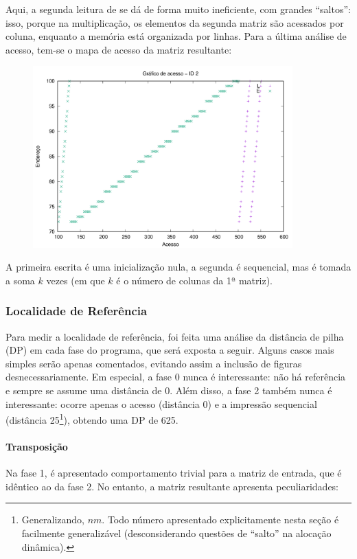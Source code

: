\documentclass{article}
\begin{document}
Aqui, a segunda leitura de se dá de forma muito ineficiente, com grandes ``saltos'': isso, porque na multiplicação, os elementos da segunda matriz são acessados por coluna, enquanto a memória está organizada por linhas. Para a última análise de acesso, tem-se o mapa de acesso da matriz resultante:

\begin{figure} [H]
    \includegraphics[width=10cm]{m-acesso-2.png} 
    \centering
\end{figure}

A primeira escrita é uma inicialização nula, a segunda é sequencial, mas é tomada a soma \( k \) vezes (em que \( k \) é o número de colunas da 1ª matriz).

\subsubsection{Localidade de Referência}

Para medir a localidade de referência, foi feita uma análise da distância de pilha (DP) em cada fase do programa, que será exposta a seguir. Alguns casos mais simples serão apenas comentados, evitando assim a inclusão de figuras desnecessariamente. Em especial, a fase 0 nunca é interessante: não há referência e sempre se assume uma distância de 0. Além disso, a fase 2 também nunca é interessante: ocorre apenas o acesso (distância 0) e a impressão sequencial (distância 25\footnote{Generalizando, \( nm \). Todo número apresentado explicitamente nesta seção é facilmente generalizável (desconsiderando questões de ``salto'' na alocação dinâmica).}), obtendo uma DP de 625.

\paragraph{Transposição} Na fase 1, é apresentado comportamento trivial para a matriz de entrada, que é idêntico ao da fase 2. No entanto, a matriz resultante apresenta peculiaridades:
\end{document}
